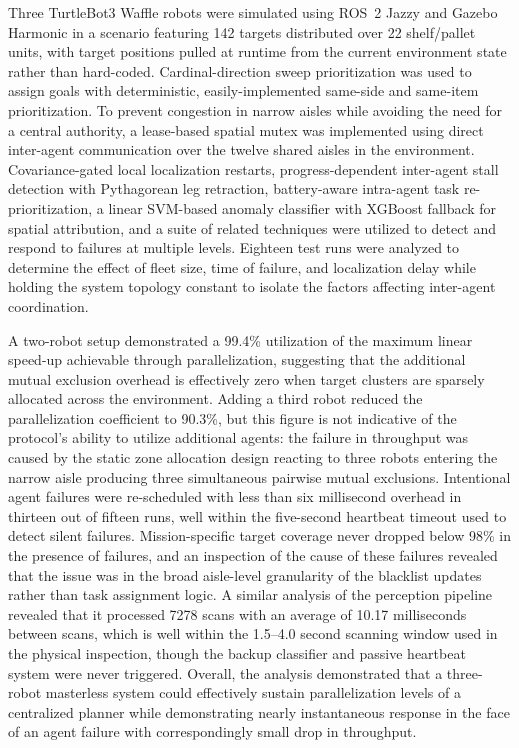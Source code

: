 \vspace*{0.3cm}
\noindent
Three TurtleBot3 Waffle robots were simulated using ROS~2 Jazzy and Gazebo Harmonic in a scenario featuring 142 targets distributed over 22 shelf/pallet units, with target positions pulled at runtime from the current environment state rather than hard-coded. Cardinal-direction sweep prioritization was used to assign goals with deterministic, easily-implemented same-side and same-item prioritization. To prevent congestion in narrow aisles while avoiding the need for a central authority, a lease-based spatial mutex was implemented using direct inter-agent communication over the twelve shared aisles in the environment. Covariance-gated local localization restarts, progress-dependent inter-agent stall detection with Pythagorean leg retraction, battery-aware intra-agent task re-prioritization, a linear SVM-based anomaly classifier with XGBoost fallback for spatial attribution, and a suite of related techniques were utilized to detect and respond to failures at multiple levels. Eighteen test runs were analyzed to determine the effect of fleet size, time of failure, and localization delay while holding the system topology constant to isolate the factors affecting inter-agent coordination.

\vspace*{0.3cm}
\noindent
A two-robot setup demonstrated a 99.4\% utilization of the maximum linear speed-up achievable through parallelization, suggesting that the additional mutual exclusion overhead is effectively zero when target clusters are sparsely allocated across the environment. Adding a third robot reduced the parallelization coefficient to 90.3\%, but this figure is not indicative of the protocol's ability to utilize additional agents: the failure in throughput was caused by the static zone allocation design reacting to three robots entering the narrow aisle producing three simultaneous pairwise mutual exclusions. Intentional agent failures were re-scheduled with less than six millisecond overhead in thirteen out of fifteen runs, well within the five-second heartbeat timeout used to detect silent failures. Mission-specific target coverage never dropped below 98\% in the presence of failures, and an inspection of the cause of these failures revealed that the issue was in the broad aisle-level granularity of the blacklist updates rather than task assignment logic. A similar analysis of the perception pipeline revealed that it processed 7278 scans with an average of 10.17 milliseconds between scans, which is well within the 1.5--4.0 second scanning window used in the physical inspection, though the backup classifier and passive heartbeat system were never triggered. Overall, the analysis demonstrated that a three-robot masterless system could effectively sustain parallelization levels of a centralized planner while demonstrating nearly instantaneous response in the face of an agent failure with correspondingly small drop in throughput.

